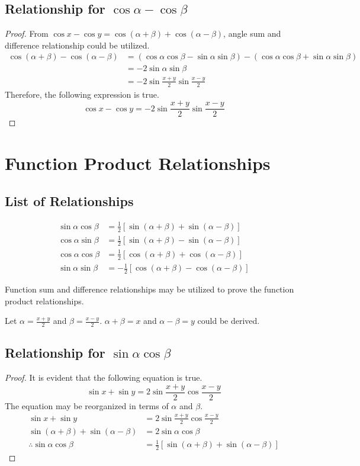 \documentclass{article}
\begin{document}
\subsection{Relationship for $\cos\alpha-\cos\beta$}
\begin{proof}
    From $\cos x - \cos y=\cos(\alpha+\beta)+\cos(\alpha-\beta)$, angle sum and difference relationship could be utilized.
    \begin{align*}
        \cos(\alpha+\beta)-\cos(\alpha-\beta)&=(\cos\alpha\cos\beta-\sin\alpha\sin\beta)-(\cos\alpha\cos\beta+\sin\alpha\sin\beta) \\
        &=-2\sin\alpha\sin\beta \\
        &=-2\sin\frac{x+y}{2}\sin\frac{x-y}{2}
    \end{align*}
    Therefore, the following expression is true.
    \[
    \cos x - \cos y=-2\sin\frac{x+y}{2}\sin\frac{x-y}{2}
    \]
\end{proof}


\section{Function Product Relationships}
\subsection{List of Relationships}
\begin{align*}
    \sin\alpha\cos\beta&=\frac{1}{2}[\sin(\alpha+\beta)+\sin(\alpha-\beta)] \\
    \cos\alpha\sin\beta&=\frac{1}{2}[\sin(\alpha+\beta)-\sin(\alpha-\beta)] \\
    \cos\alpha\cos\beta&=\frac{1}{2}[\cos(\alpha+\beta)+\cos(\alpha-\beta)] \\
    \sin\alpha\sin\beta&=-\frac{1}{2}[\cos(\alpha+\beta)-\cos(\alpha-\beta)]
\end{align*}

\noindent
Function sum and difference relationships may be utilized to prove the function product relationships.

Let $\alpha=\frac{x+y}{2}$ and $\beta=\frac{x-y}{2}$. $\alpha+\beta=x$ and $\alpha-\beta=y$ could be derived.
\subsection{Relationship for $\sin\alpha\cos\beta$}
\begin{proof}
    It is evident that the following equation is true.
    \[
    \sin x + \sin y=2\sin\frac{x+y}{2}\cos\frac{x-y}{2}
    \]
    The equation may be reorganized in terms of $\alpha$ and $\beta$.
    \begin{align*}
        \sin x + \sin y&=2\sin\frac{x+y}{2}\cos\frac{x-y}{2} \\
        \sin(\alpha+\beta) + \sin(\alpha-\beta)&=2\sin\alpha\cos\beta \\
        \therefore \sin\alpha\cos\beta&=\frac{1}{2}[\sin(\alpha+\beta)+\sin(\alpha-\beta)]
    \end{align*}
\end{proof}
\end{document}
